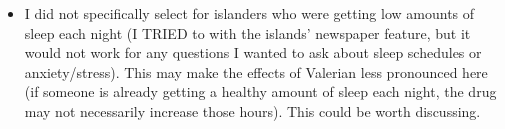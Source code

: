 \documentclass[10pt,preprintnumbers,amsmath,amssymb,floatfix,twocolumn,prl]{revtex4-2}
\begin{document}
\begin{itemize}
\item I did not specifically select for islanders who were getting low amounts of sleep each night (I TRIED to with the islands' newspaper feature, but it would not work for any questions I wanted to ask about sleep schedules or anxiety/stress). This may make the effects of Valerian less pronounced here (if someone is already getting a healthy amount of sleep each night, the drug may not necessarily increase those hours). This could be worth discussing.
\end{itemize}



\end{document}
